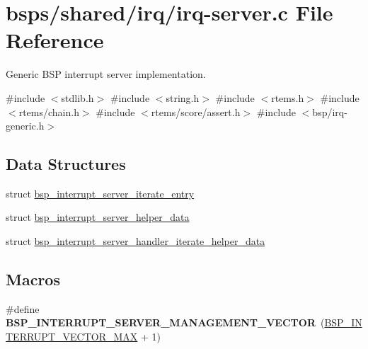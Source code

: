 \hypertarget{irq-server_8c}{}\section{bsps/shared/irq/irq-\/server.c File Reference}
\label{irq-server_8c}


Generic B\+SP interrupt server implementation.  


{\ttfamily \#include $<$stdlib.\+h$>$}\newline
{\ttfamily \#include $<$string.\+h$>$}\newline
{\ttfamily \#include $<$rtems.\+h$>$}\newline
{\ttfamily \#include $<$rtems/chain.\+h$>$}\newline
{\ttfamily \#include $<$rtems/score/assert.\+h$>$}\newline
{\ttfamily \#include $<$bsp/irq-\/generic.\+h$>$}\newline
\subsection*{Data Structures}
\begin{DoxyCompactItemize}
\item 
struct \mbox{\hyperlink{structbsp__interrupt__server__iterate__entry}{bsp\+\_\+interrupt\+\_\+server\+\_\+iterate\+\_\+entry}}
\item 
struct \mbox{\hyperlink{structbsp__interrupt__server__helper__data}{bsp\+\_\+interrupt\+\_\+server\+\_\+helper\+\_\+data}}
\item 
struct \mbox{\hyperlink{structbsp__interrupt__server__handler__iterate__helper__data}{bsp\+\_\+interrupt\+\_\+server\+\_\+handler\+\_\+iterate\+\_\+helper\+\_\+data}}
\end{DoxyCompactItemize}
\subsection*{Macros}
\begin{DoxyCompactItemize}
\item 
\mbox{\label{irq-server_8c_ab1ca238b32d549cfdfabd2cbec0e40cf}} 
\#define {\bfseries B\+S\+P\+\_\+\+I\+N\+T\+E\+R\+R\+U\+P\+T\+\_\+\+S\+E\+R\+V\+E\+R\+\_\+\+M\+A\+N\+A\+G\+E\+M\+E\+N\+T\+\_\+\+V\+E\+C\+T\+OR}~(\mbox{\hyperlink{group__bsp__interrupt_gae4a2cdda5816a4c83c2fac0a49880c6e}{B\+S\+P\+\_\+\+I\+N\+T\+E\+R\+R\+U\+P\+T\+\_\+\+V\+E\+C\+T\+O\+R\+\_\+\+M\+AX}} + 1)
\end{DoxyCompactItemize}
